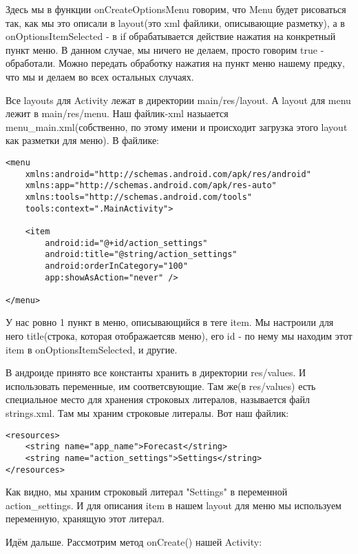 \documentclass[12 pt]{article}
\begin{document}
    Здесь мы в функции onCreateOptionsMenu говорим, что Menu будет рисоваться так, как мы это описали в layout(это xml файлики, описывающие разметку), а в onOptionsItemSelected - в if обрабатывается действие нажатия на конкретный пункт меню. В данном случае, мы ничего не делаем, просто говорим true - обработали. Можно передать обработку нажатия на пункт меню нашему предку, что мы и делаем во всех остальных случаях.
    
    Все layouts для Activity лежат в директории main/res/layout. А layout для menu лежит в main/res/menu. Наш файлик-xml назыается menu\_main.xml(собственно, по этому имени и происходит загрузка этого layout как разметки для меню). В файлике:
    
    \begin{lstlisting}
<menu
    xmlns:android="http://schemas.android.com/apk/res/android"
    xmlns:app="http://schemas.android.com/apk/res-auto"
    xmlns:tools="http://schemas.android.com/tools"
    tools:context=".MainActivity">

    <item
        android:id="@+id/action_settings"
        android:title="@string/action_settings"
        android:orderInCategory="100"
        app:showAsAction="never" />

</menu>    
    \end{lstlisting}
    
    У нас ровно 1 пункт в меню, описывающийся в теге item. Мы настроили для него title(строка, которая отображаетсяв меню), его id - по нему мы находим этот item в onOptionsItemSelected, и другие.
    
    В андроиде принято все константы хранить в директории res/values. И использовать переменные, им соответсвующие. Там же(в res/values) есть специальное место для хранения строковых литералов, называется файл strings.xml. Там мы храним строковые литералы. Вот наш файлик:
    
    \begin{lstlisting}
<resources>
    <string name="app_name">Forecast</string>
    <string name="action_settings">Settings</string>
</resources>   
    \end{lstlisting}
    
    Как видно, мы храним строковый литерал "Settings" в переменной action\_settings. И для описания item в нашем layout для меню мы используем переменную, хранящую этот литерал.
    
    Идём дальше. Рассмотрим метод onCreate() нашей Activity:
    
\end{document}
